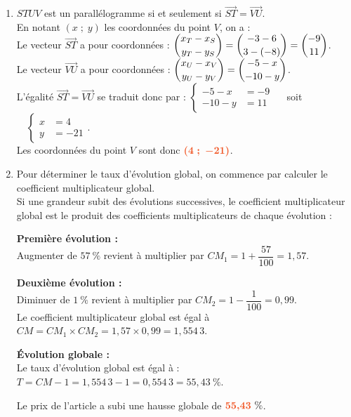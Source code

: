 \documentclass[a4paper,11pt]{article}
\begin{document}
{\begin{seanceD}{}
\begin{enumerate}
\item  $STUV$ est un parallélogramme si et seulement si $\overrightarrow{ST} = \overrightarrow{VU}$.\\En notant $(x\;;\;y)$ les coordonnées du point $V$, on a :\\Le vecteur $\overrightarrow{ST}$ a pour coordonnées : $\dbinom{x_T - x_S}{y_T - y_S }=\dbinom{-3-6}{3-(-8)} = \dbinom{-9}{11}$.\\Le vecteur $\overrightarrow{VU}$ a pour coordonnées : $\dbinom{x_U - x_V}{y_U - y_V }=\dbinom{-5 - x}{-10 - y}$.\\L'égalité $\overrightarrow{ST} = \overrightarrow{VU}$ se traduit donc par : $\begin{cases}-5 - x &= -9 \\ -10 - y &= 11\end{cases}\quad$ soit $\quad\begin{cases}x &= 4 \\ y &= -21\end{cases}$.\\Les coordonnées du point $V$ sont donc ${\color[HTML]{f15929}\boldsymbol{(4\;;\;-21)}}$.

\item Pour déterminer le taux d'évolution global, on commence par calculer le coefficient multiplicateur global.\\Si une grandeur subit des évolutions successives, le coefficient multiplicateur global est le produit des coefficients multiplicateurs de chaque évolution :

\medskip
\textbf{Première évolution :} \\
          Augmenter de $57~\%$ revient à multiplier par $CM_1 = 1 + \dfrac{57}{100} = 1{,}57$.

\medskip
\textbf{Deuxième évolution :}\\ Diminuer de $1~\%$ revient à multiplier par $CM_2 = 1 - \dfrac{1}{100} = 0{,}99$.\\Le coefficient multiplicateur global est égal à $CM = CM_1 \times CM_2 = 1{,}57 \times 0{,}99 =1{,}554\,3$.

\medskip
\textbf{Évolution globale :}\\
          Le taux d'évolution global est égal à : $T=CM-1=1{,}554\,3-1=0{,}554\,3=55{,}43~\%$.

\medskip
Le prix de l'article a subi une hausse globale de ${\color[HTML]{f15929}\boldsymbol{55{,}43}}~\%$.

\end{enumerate}

\end{seanceD}
}{}
\end{document}
